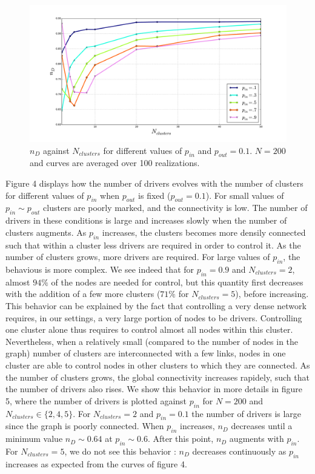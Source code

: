 \documentclass[conference]{IEEEtran}
\begin{document}
\begin{figure}
\label{fig:block_model_1}
\includegraphics[scale=.25]{block_model_3}
\caption{$n_D$ against $N_{clusters} $ for different values of $ p_{in} $ and $ p_{out} = 0.1 $. $ N=200 $ and curves are averaged over 100 realizations.}
\end{figure}

Figure 4 displays how the number of drivers evolves with the number of clusters for different values of $ p_{in} $ when $ p_{out} $ is fixed ($p_{out} =0.1$). For small values of $ p_{in} \sim p_{out} $ clusters are poorly marked, and the connectivity is low. The number of drivers in these conditions is large and increases slowly when the number of clusters augments. As $ p_{in} $ increases, the clusters becomes more densily connected such that within a cluster less drivers are required in order to control it. As the number of clusters grows, more drivers are required. For large values of $p_{in} $, the behavious is more complex. We see indeed that for $p_{in} = 0.9 $ and $N_{clusters} = 2$, almost $ 94\% $ of the nodes are needed for control, but this quantity first decreases with the addition of a few more clusters ($ 71\% $ for $ N_{clusters}=5 $), before increasing. This behavior can be explained by the fact that controlling a very dense network requires, in our settings, a very large portion of nodes to be drivers. Controlling one cluster alone thus requires to control almost all nodes within this cluster. Nevertheless, when a relatively small (compared to the number of nodes in the graph) number of clusters are interconnected with a few links, nodes in one cluster are able to control nodes in other clusters to which they are connected. As the number of clusters grows, the global connectivity increases rapidely, such that the number of drivers also rises. We show this behavior in more details in figure 5, where the number of drivers is plotted against $ p_{in} $ for $N=200$ and $N_{clusters} \in \{2,4,5\} $. For $N_{clusters} = 2 $ and $ p_{in} = 0.1 $ the number of drivers is large since the graph is poorly connected. When $p_{in} $ increases, $n_D$ decreases until a minimum value $n_D \sim 0.64 $ at $ p_{in} \sim 0.6 $. After this point, $n_D$ augments with $p_{in}$. For $N_{clusters} = 5 $, we do not see this behavior : $ n_D $ decreases continuously as $p_{in} $ increases as expected from the curves of figure 4.
\end{document}
